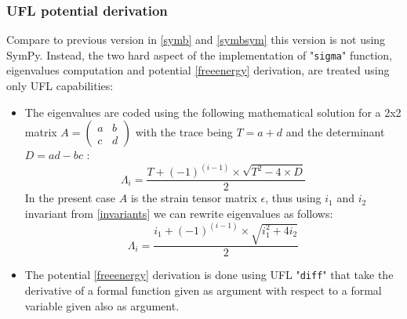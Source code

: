 \documentclass[12pt]{article}
\newcommand{\tens}[1]{
	{\ensuremath{\mathsf{#1}}}
}
\newcommand{\mycodepy}[1]{\textsf{"}\lstinline[language=Python]`#1`\textsf{"}}
\begin{document}
\subsubsection{UFL potential derivation \label{ufl}}
Compare to previous version in \ref{symb} and \ref{symbsym} this version is not using SymPy. Instead, the two hard aspect of the implementation of \mycodepy{sigma} function,  
eigenvalues computation and potential \eqref{freeenergy} derivation, are treated using only UFL capabilities:
\begin{itemize}
	\item The eigenvalues are coded using the following mathematical solution for a 2x2 matrix  $A=\left( \begin{array}{cc}
		a&b \\ c&d
	\end{array}\right)$ with the trace being $T=a+d$ and the determinant $D=ad-bc$ : $$\Lambda_i=\frac{T+(-1)^{(i-1)}\times \sqrt{T^2-4\times D}}{2}$$In the present case $A$ is the strain tensor matrix $\tens{\epsilon}$, thus using  $i_1$ and  $i_2$ invariant from \eqref{invariants}
 we can rewrite eigenvalues as follows: \begin{equation}\Lambda_i=\frac{i_1+(-1)^{(i-1)}\times \sqrt{i_1^2+4 i_2}}{2}\label{eignvalues}\end{equation}

	\item The potential \eqref{freeenergy} derivation is done using UFL \mycodepy{diff} that take the derivative of a formal function given as argument with respect to a formal variable given also as argument.
\end{itemize}
\end{document}
